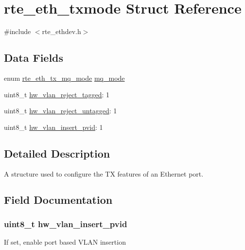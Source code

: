 \hypertarget{structrte__eth__txmode}{}\section{rte\+\_\+eth\+\_\+txmode Struct Reference}
\label{structrte__eth__txmode}


{\ttfamily \#include $<$rte\+\_\+ethdev.\+h$>$}

\subsection*{Data Fields}
\begin{DoxyCompactItemize}
\item 
enum \hyperlink{rte__ethdev_8h_a4834f572f4dd4e46d81ad09b7d5fffd5}{rte\+\_\+eth\+\_\+tx\+\_\+mq\+\_\+mode} \hyperlink{structrte__eth__txmode_aac4d1eaef063383b937a1d568412b4ce}{mq\+\_\+mode}
\item 
uint8\+\_\+t \hyperlink{structrte__eth__txmode_a6ebd244447cda58041fde4872262b10b}{hw\+\_\+vlan\+\_\+reject\+\_\+tagged}\+: 1
\item 
uint8\+\_\+t \hyperlink{structrte__eth__txmode_a7b631a6c385c85f9a5f90895b2175126}{hw\+\_\+vlan\+\_\+reject\+\_\+untagged}\+: 1
\item 
uint8\+\_\+t \hyperlink{structrte__eth__txmode_ac55eebd911425e46ce61ccf29ec8d995}{hw\+\_\+vlan\+\_\+insert\+\_\+pvid}\+: 1
\end{DoxyCompactItemize}


\subsection{Detailed Description}
A structure used to configure the T\+X features of an Ethernet port. 

\subsection{Field Documentation}
\hypertarget{structrte__eth__txmode_ac55eebd911425e46ce61ccf29ec8d995}{}
\subsubsection[{hw\+\_\+vlan\+\_\+insert\+\_\+pvid}]{\setlength{\rightskip}{0pt plus 5cm}uint8\+\_\+t hw\+\_\+vlan\+\_\+insert\+\_\+pvid}\label{structrte__eth__txmode_ac55eebd911425e46ce61ccf29ec8d995}
If set, enable port based V\+L\+A\+N insertion \hypertarget{structrte__eth__txmode_a6ebd244447cda58041fde4872262b10b}{}
